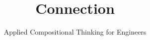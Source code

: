 \title{Connection}

\subtitle{Applied Compositional Thinking for Engineers}

\date{}



\institute[ETHZ]
{
        \begin{center}
        \end{center}
}

